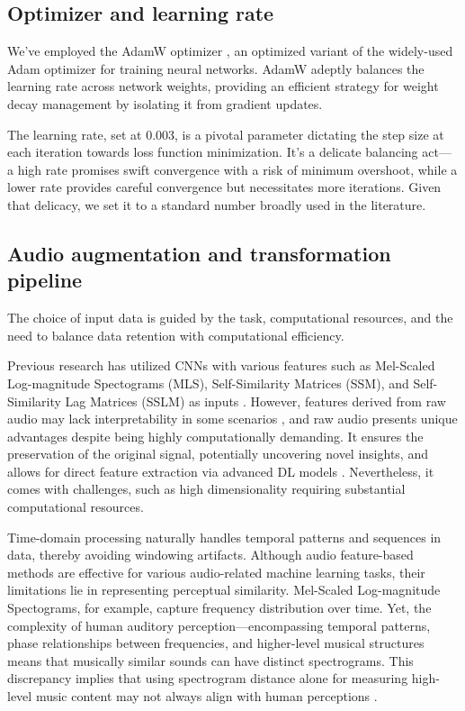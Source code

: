 \subsection{Optimizer and learning rate}

We've employed the AdamW optimizer \cite{Loshchilov2017DecoupledRegularization}, an optimized variant of the widely-used Adam optimizer for training neural networks. AdamW adeptly balances the learning rate across network weights, providing an efficient strategy for weight decay management by isolating it from gradient updates. 

The learning rate, set at 0.003, is a pivotal parameter dictating the step size at each iteration towards loss function minimization. It's a delicate balancing act— a high rate promises swift convergence with a risk of minimum overshoot, while a lower rate provides careful convergence but necessitates more iterations. Given that delicacy, we set it to a standard number broadly used in the literature.

\subsection{Audio augmentation and transformation pipeline}

The choice of input data is guided by the task, computational resources, and the need to balance data retention with computational efficiency.

Previous research has utilized CNNs with various features such as Mel-Scaled Log-magnitude Spectograms (MLS), Self-Similarity Matrices (SSM), and Self-Similarity Lag Matrices (SSLM) as inputs \cite{Hernandez-Olivan2021MusicFeatures}. However, features derived from raw audio may lack interpretability in some scenarios \cite{Schindler2020DeepTutorial}, and raw audio presents unique advantages despite being highly computationally demanding. It ensures the preservation of the original signal, potentially uncovering novel insights, and allows for direct feature extraction via advanced DL models \cite{learning, verydeep}. Nevertheless, it comes with challenges, such as high dimensionality requiring substantial computational resources. 

Time-domain processing naturally handles temporal patterns and sequences in data, thereby avoiding windowing artifacts. Although audio feature-based methods are effective for various audio-related machine learning tasks, their limitations lie in representing perceptual similarity. Mel-Scaled Log-magnitude Spectograms, for example, capture frequency distribution over time. Yet, the complexity of human auditory perception—encompassing temporal patterns, phase relationships between frequencies, and higher-level musical structures means that musically similar sounds can have distinct spectrograms. This discrepancy implies that using spectrogram distance alone for measuring high-level music content may not always align with human perceptions \cite{Kim2020OneStrategies, Mesostructures2023}.

